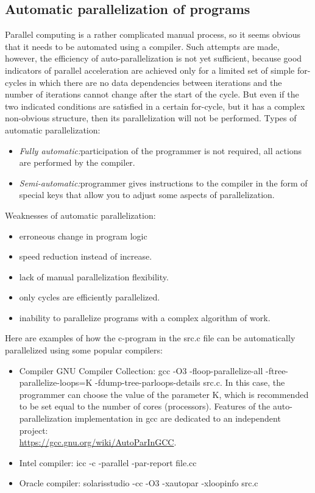 { %
	\subsection{Automatic parallelization of programs}
	\par Parallel computing is a rather complicated manual process, so it seems obvious that it needs to be automated using a compiler. Such attempts are made, however, the efficiency of auto-parallelization is not yet sufficient, because good indicators of parallel acceleration are achieved only for a limited set of simple for-cycles in which there are no data dependencies between iterations and the number of iterations cannot change after the start of the cycle. But even if the two indicated conditions are satisfied in a certain for-cycle, but it has a complex non-obvious structure, then its parallelization will not be performed. Types of automatic parallelization:
	\begin{itemize}
		\item\textit{Fully automatic:}\quad participation of the programmer is not required, all actions are performed by the compiler.
		\item\textit{Semi-automatic:}\quad programmer gives instructions to the compiler in the form of special keys that allow you to adjust some aspects of parallelization.
	\end{itemize}
	\par Weaknesses of automatic parallelization:
	\begin{itemize}
		\item erroneous change in program logic
		\item speed reduction instead of increase.
		\item lack of manual parallelization flexibility.
		\item only cycles are efficiently parallelized.
		\item inability to parallelize programs with a complex algorithm of work.
	\end{itemize}
	\par Here are examples of how the c-program in the src.c file can be automatically parallelized using some popular compilers:
	\begin{itemize}
		\item Compiler GNU Compiler Collection:	 
gcc -O3 -floop-parallelize-all -ftree-parallelize-loops=K -fdump-tree-parloops-details src.c. In this case, the programmer can choose the value of the parameter K, which is recommended to be set equal to the number of cores (processors). Features of the auto-parallelization implementation in gcc are dedicated to an independent project:\\ \url{https://gcc.gnu.org/wiki/AutoParInGCC}. 
		\item Intel compiler:	 
icc -c -parallel -par-report file.cc
		\item Oracle compiler:	 
solarisstudio -cc -O3 -xautopar -xloopinfo src.c
	\end{itemize}
}